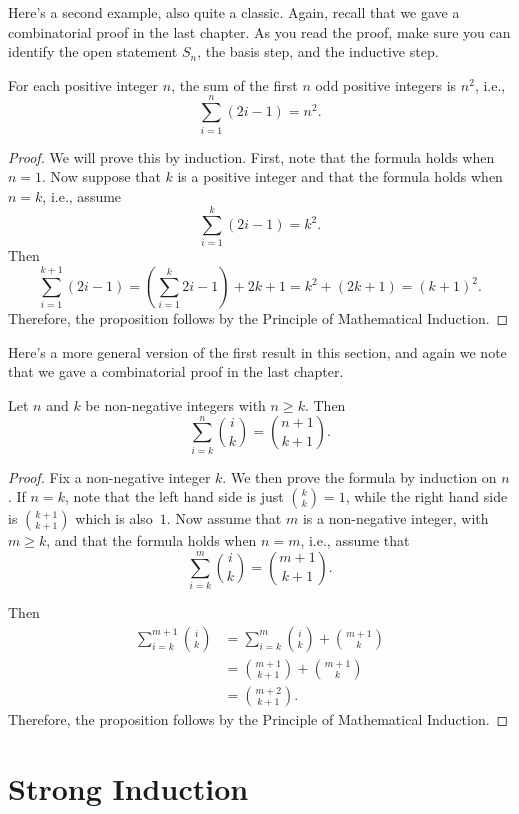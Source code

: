 Here's a second example, also quite a classic.  Again, recall that we
gave a combinatorial proof in the last chapter. As you read the proof,
make sure you can identify the open statement $S_n$, the basis step,
and the inductive step.

\begin{proposition}\label{prop:sumodd}
For each positive integer $n$, the
sum of the first $n$ odd positive integers is $n^2$, i.e.,
\[
\sum_{i=1}^n (2i-1)= n^2.
\]
\end{proposition}
\begin{proof}
We will prove this by induction. First, note that the formula holds when
$n=1$.  Now suppose that $k$ is a positive integer and
that the formula holds when $n=k$, i.e., assume
\[
\sum_{i=1}^k (2i-1)= k^2.
\]
Then
\[
\sum_{i=1}^{k+1}(2i-1)=\left(\sum_{i=1}^k 2i-1\right)+2k+1=
k^2+(2k+1)=(k+1)^2.
\]
Therefore, the proposition follows by the Principle of Mathematical Induction.
\end{proof}

Here's a more general version of the first result in
this section, and again we note that we gave a combinatorial
proof in the last chapter.

\begin{proposition}\label{prop:sum-bincoeffs}
Let $n$ and $k$ be non-negative integers with $n\ge k$.
Then
\[
\sum_{i=k}^n \binom{i}{k}=\binom{n+1}{k+1}.
\]
\end{proposition}
\begin{proof}
Fix a non-negative integer $k$.  We then prove the
formula by induction on $n$.  If $n=k$, note that
the left hand side is just $\binom{k}{k}=1$, while the
right hand side is $\binom{k+1}{k+1}$ which is also~$1$.
Now assume that $m$ is a non-negative integer, with 
$m\ge k$, and that the
formula holds when $n=m$, i.e., assume that
\[
\sum_{i=k}^m \binom{i}{k}=\binom{m+1}{k+1}.
\]

Then
\begin{align*}
\sum_{i=k}^{m+1}\binom{i}{k} &= \sum_{i=k}^{m}\binom{i}{k} +\binom{m+1}{k}\\
        &=\binom{m+1}{k+1}+\binom{m+1}{k}\\
        &=\binom{m+2}{k+1}.
\end{align*} 
Therefore, the proposition follows by the Principle of Mathematical Induction.
\end{proof}


\section{Strong Induction}

